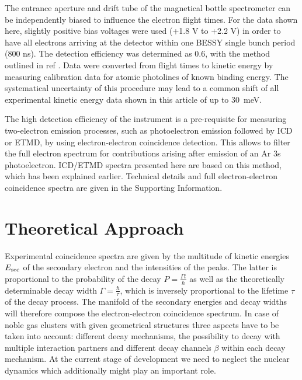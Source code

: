 \documentclass[journal=jpccck,manuscript=article]{achemso}
\begin{document}
The entrance aperture and drift tube of the magnetical bottle spectrometer can be independently biased to influence the electron flight times. 
For the data shown here, slightly positive bias voltages were used (+1.8 V to +2.2 V) in order to have all electrons arriving at the detector within one BESSY single bunch period (800 ns). 
The detection efficiency was determined as 0.6, with the method outlined in ref .
Data were converted from flight times to kinetic energy by measuring calibration data for atomic photolines of known binding energy.
The systematical uncertainty of this procedure may lead to a common shift of all experimental kinetic energy data shown in this article of up to 30~meV.

The high detection efficiency of the instrument is a pre-requisite for measuring two-electron emission processes, such as photoelectron emission followed by ICD or ETMD, by using electron-electron coincidence detection. 
This allows to filter the full electron spectrum for contributions arising after emission of an Ar 3s photoelectron.
ICD/ETMD spectra presented here are based on this method, which has been explained earlier.\cite{mucke_review,Foerstel_phd}
Technical details and full electron-electron coincidence spectra are given in the Supporting Information.


\section{Theoretical Approach}
%
Experimental coincidence spectra are given by the multitude of
kinetic energies $E_{\rm sec}$ of the secondary electron
and the intensities of the peaks. The latter is proportional to the
probability of the decay $P=\frac{\Gamma t}{\hbar}$
as well as the theoretically determinable
decay width $\Gamma=\frac{\hbar}{\tau}$,
which is inversely proportional to the lifetime $\tau$ of the decay process.
The manifold of the
secondary energies and decay widths will therefore compose the electron-electron
coincidence spectrum.
In case of noble gas clusters
with given geometrical structures three aspects have to be taken into account:
different decay mechanisms, the possibility to decay with multiple
interaction partners and different decay channels $\beta$ within
each decay mechanism.
At the current stage of development we need to neglect the nuclear dynamics which
additionally might play an important role.
\end{document}
